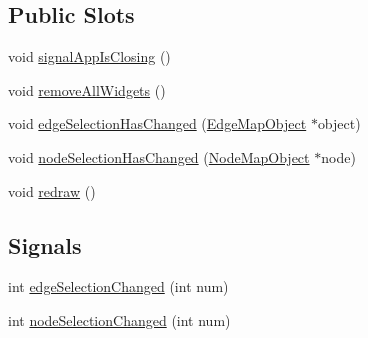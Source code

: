 \subsection*{Public Slots}
\begin{DoxyCompactItemize}
\item 
void \mbox{\hyperlink{class_map_objects_controller_a0f00a5396639ddc7950826d484d4b6dc}{signal\+App\+Is\+Closing}} ()
\item 
void \mbox{\hyperlink{class_map_objects_controller_a9595a756898d0d354732617412655979}{remove\+All\+Widgets}} ()
\item 
void \mbox{\hyperlink{class_map_objects_controller_ac25dc2b804809b78d6a4a602ca1eb0a9}{edge\+Selection\+Has\+Changed}} (\mbox{\hyperlink{class_edge_map_object}{Edge\+Map\+Object}} $\ast$object)
\item 
void \mbox{\hyperlink{class_map_objects_controller_a010a68723e17c8a602fd60f2d041c971}{node\+Selection\+Has\+Changed}} (\mbox{\hyperlink{class_node_map_object}{Node\+Map\+Object}} $\ast$node)
\item 
void \mbox{\hyperlink{class_map_objects_controller_a8b6904a64b58a44235c1d6ac555a1822}{redraw}} ()
\end{DoxyCompactItemize}
\subsection*{Signals}
\begin{DoxyCompactItemize}
\item 
int \mbox{\hyperlink{class_map_objects_controller_a9d74c2161e932720b0295e72a4036a0c}{edge\+Selection\+Changed}} (int num)
\item 
int \mbox{\hyperlink{class_map_objects_controller_a5988e07a510370a70cd73f573040360a}{node\+Selection\+Changed}} (int num)
\end{DoxyCompactItemize}
